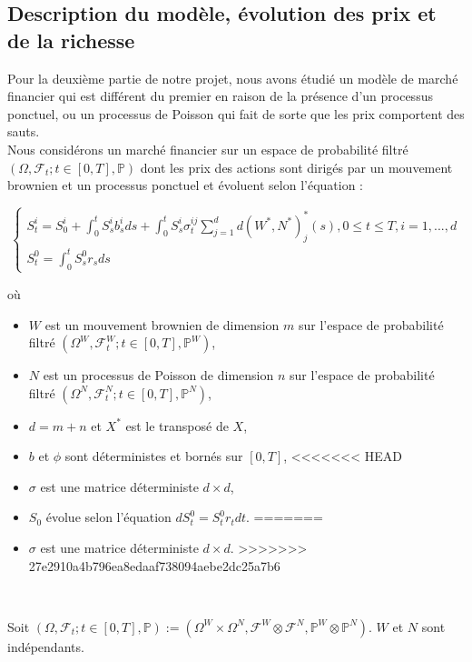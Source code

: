 \documentclass[../finalreport.tex]{subfiles}
\begin{document}
\subsection{Description du modèle, évolution des prix et de la richesse}
Pour la deuxième partie de notre projet, nous avons étudié un modèle de marché financier qui est différent du premier en raison de la présence d'un processus ponctuel, ou un processus de Poisson qui fait de sorte que les prix comportent des sauts.\\

Nous considérons un marché financier sur un espace de probabilité filtré $(\Omega, \mathcal{F}_t; t \in [0, T], \mathbb{P})$ dont les prix des actions sont dirigés par un mouvement brownien et un processus ponctuel et évoluent selon l'équation : 

\begin{equation}
\begin{cases}S_t^i = S_0^i + \int_{0}^{t}S_s^i b_s^i ds + \int_{0}^{t}S_s^i \sigma^{ij}_t \sum_{j = 1}^{d} d(W^*, N^*)^{*}_j(s), 0 \leq t \leq T, i = 1, ..., d \\
S^0_t = \int_{0}^{t} S^0_s r_s ds \end{cases}
\end{equation}

où\\

\begin{itemize} 
\item $W$ est un mouvement brownien de dimension $m$ sur l'espace de probabilité filtré $(\Omega^W, \mathcal{F}^W_t; t \in [0, T], \mathbb{P}^W)$,
\item $N$ est un processus de Poisson de dimension $n$ sur l'espace de probabilité filtré $(\Omega^N, \mathcal{F}^N_t; t \in [0, T], \mathbb{P}^N)$,
\item $d = m+n$ et $X^*$ est le transposé de $X$,
\item $b$ et $\phi$ sont déterministes et bornés sur $[0, T]$,
<<<<<<< HEAD
\item $\sigma$ est une matrice déterministe $d \times d$,
\item $S_0$ évolue selon l'équation $dS^0_t = S^0_t r_t dt$.
=======
\item $\sigma$ est une matrice déterministe $d \times d$.
>>>>>>> 27e2910a4b796ea8edaaf738094aebe2dc25a7b6
\end{itemize}
\

Soit $(\Omega, \mathcal{F}_t; t\in [0, T], \mathbb{P}) := (\Omega^W \times \Omega^N, \mathcal{F}^W \otimes \mathcal{F}^N, \mathbb{P}^W \otimes \mathbb{P}^N)$. $W$ et $N$ sont indépendants. \\
\end{document}
